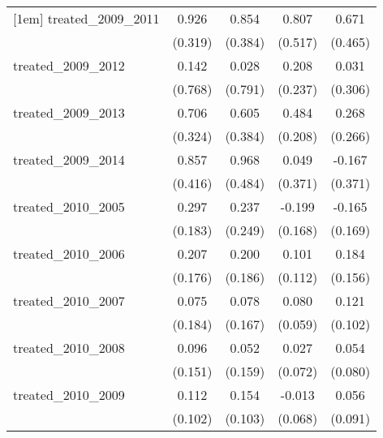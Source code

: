 {\begin{tabular}{l*{4}{c}}
[1em]
treated\_2009\_2011&       0.926\sym{**} &       0.854\sym{*}  &       0.807         &       0.671         \\
            &     (0.319)         &     (0.384)         &     (0.517)         &     (0.465)         \\
[1em]
treated\_2009\_2012&       0.142         &       0.028         &       0.208         &       0.031         \\
            &     (0.768)         &     (0.791)         &     (0.237)         &     (0.306)         \\
[1em]
treated\_2009\_2013&       0.706\sym{*}  &       0.605         &       0.484\sym{*}  &       0.268         \\
            &     (0.324)         &     (0.384)         &     (0.208)         &     (0.266)         \\
[1em]
treated\_2009\_2014&       0.857\sym{*}  &       0.968\sym{*}  &       0.049         &      -0.167         \\
            &     (0.416)         &     (0.484)         &     (0.371)         &     (0.371)         \\
[1em]
treated\_2010\_2005&       0.297         &       0.237         &      -0.199         &      -0.165         \\
            &     (0.183)         &     (0.249)         &     (0.168)         &     (0.169)         \\
[1em]
treated\_2010\_2006&       0.207         &       0.200         &       0.101         &       0.184         \\
            &     (0.176)         &     (0.186)         &     (0.112)         &     (0.156)         \\
[1em]
treated\_2010\_2007&       0.075         &       0.078         &       0.080         &       0.121         \\
            &     (0.184)         &     (0.167)         &     (0.059)         &     (0.102)         \\
[1em]
treated\_2010\_2008&       0.096         &       0.052         &       0.027         &       0.054         \\
            &     (0.151)         &     (0.159)         &     (0.072)         &     (0.080)         \\
[1em]
treated\_2010\_2009&       0.112         &       0.154         &      -0.013         &       0.056         \\
            &     (0.102)         &     (0.103)         &     (0.068)         &     (0.091)         \\

\end{tabular}}
